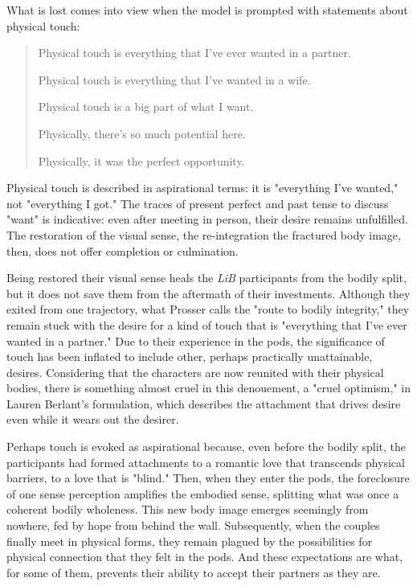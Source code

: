 \documentclass[11pt]{article}
\begin{document}
What is lost comes into view when the model is prompted with
statements about physical touch:
\begin{quote}
Physical touch is everything that I've ever wanted in a partner.

Physical touch is everything that I've wanted in a wife.

Physical touch is a big part of what I want.

Physically, there's so much potential here.

Physically, it was the perfect opportunity.
\end{quote}
Physical touch is described in aspirational terms: it is "everything
I've wanted," not "everything I got." The traces of present perfect
and past tense to discuss "want" is indicative: even after meeting in
person, their desire remains unfulfilled. The restoration of the
visual sense, the re-integration the fractured body image, then, does
not offer completion or culmination.

Being restored their visual sense heals the \emph{LiB} participants from
the bodily split, but it does not save them from the aftermath of
their investments. Although they exited from one trajectory, what
Prosser calls the "route to bodily integrity," they remain stuck with
the desire for a kind of touch that is "everything that I've ever
wanted in a partner." Due to their experience in the pods, the
significance of touch has been inflated to include other, perhaps
practically unattainable, desires. Considering that the characters are
now reunited with their physical bodies, there is something almost
cruel in this denouement, a "cruel optimism," in Lauren Berlant's
formulation, which describes the attachment that drives desire even
while it wears out the desirer.

Perhaps touch is evoked as aspirational because, even before the
bodily split, the participants had formed attachments to a romantic
love that transcends physical barriers, to a love that is "blind."
Then, when they enter the pods, the foreclosure of one sense
perception amplifies the embodied sense, splitting what was once a
coherent bodily wholeness. This new body image emerges seemingly from
nowhere, fed by hope from behind the wall. Subsequently, when the
couples finally meet in physical forms, they remain plagued by the
possibilities for physical connection that they felt in the pods. And
these expectations are what, for some of them, prevents their ability
to accept their partners as they are.
\end{document}
